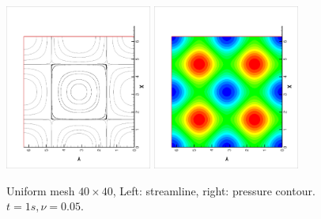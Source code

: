 \documentclass{article}
\begin{document}
 \begin{figure}[ht]
   \centering
   \includegraphics[width = 0.43\textwidth, angle = -90]{./uniform40_streamline.eps}
   \includegraphics[width = 0.43\textwidth, angle = -90]{./uniform40_pressure.eps}
   \caption{\small Uniform mesh $40 \times
     40$, Left: streamline, right: pressure contour. $t = 1s, \nu = 0.05$.}
   \label{fig::uniform40_solution}
 \end{figure}
\end{document}
